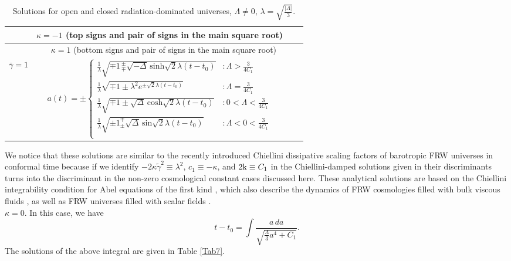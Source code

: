\documentclass[
showkeys,
preprintnumbers,amsmath,amssymb,APS]{revtex4}
\begin{document}
\begin{table}[ht!]
\begin{center}
\begin{tabular}{|c|c|c|c|}
\hline  & $\kappa=-1$ (top signs and pair of signs in the main square root)\\ \hline & $\quad \kappa=1$ (bottom signs and pair of signs in the main square root) \\
\hline
\hline
$\bar\gamma=1$  &   $a(t) =\pm  \left\{
     \begin{array}{lr}
         \frac 1 \lambda\sqrt{\mp 1\, {}_{\mp}^{\pm}\sqrt {-\Delta}\, \mathrm{sinh}\sqrt{2}\lambda(t-t_0)} & : \Lambda>\frac{3}{4C_1}\\
        \frac{1}{\lambda}\sqrt{\mp 1\pm\lambda^2e^{\pm \sqrt{2} \lambda(t-t_0)}} & : \Lambda=\frac{3}{4C_1}\\
         \frac 1 \lambda  \sqrt{\mp 1\pm \sqrt {\Delta}\, \mathrm{cosh}\sqrt{2}\lambda(t-t_0)} &:0< \Lambda<\frac{3}{4C_1}\\
        \frac 1 \lambda\sqrt{\pm 1{}_{\pm}^{\mp}\sqrt {\Delta}\, \mathrm{sin}\sqrt{2} \lambda(t-t_0)}&: \Lambda<0<\frac{3}{4C_1}\\
     \end{array}
   \right.$ \rule[0.5cm]{0cm}{0.8cm}\\
\hline
\end{tabular}
\end{center}
\caption{Solutions for open and closed radiation-dominated universes, $\Lambda \ne 0$, $\lambda=\sqrt{\frac{|\Lambda|}{3}}$.}
\label{Tab3}
\end{table}


We notice that these solutions are similar to the recently introduced Chiellini dissipative scaling factors of barotropic FRW universes in conformal time because if we identify $-2\kappa\tilde{\gamma}^2\equiv\lambda^2$, $c_1\equiv -\kappa$, and $2{\rm k}\equiv C_1$ in the Chiellini-damped solutions given in \cite{pla} 
their discriminants 
turns into the discriminant in the non-zero cosmological constant cases discussed here. These analytical solutions are based on the Chiellini integrability condition for Abel equations of the first kind \cite{chiell}, which also describe the dynamics of FRW cosmologies filled with bulk viscous fluids \cite{mak1, mak2}, as well as FRW universes filled with scalar fields \cite{yy}.\\

$\kappa=0$. In this case, we have
\begin{equation}\label{eq9c}
 {\displaystyle t-t_0=\int \frac{a \, da}{\sqrt{\frac \Lambda 3  a^4+C_1}}.}
 \end{equation}
 The solutions of the above integral are given in Table \ref{Tab7}.
\end{document}

